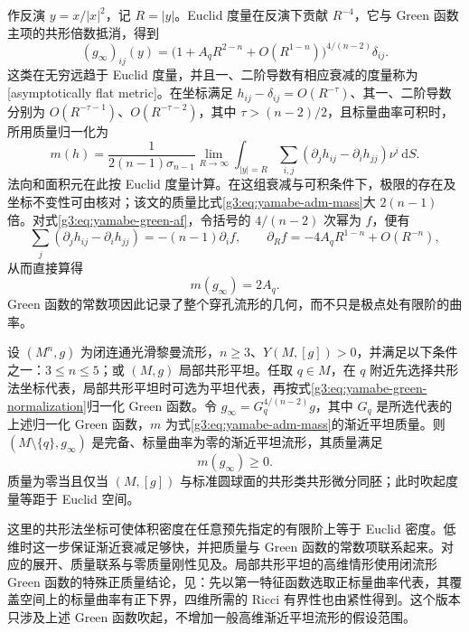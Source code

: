 \ProseParagraphBreak
作反演 \(y=x/|x|^2\)，记 \(R=|y|\)。Euclid 度量在反演下贡献 \(R^{-4}\)，它与 Green 函数主项的共形倍数抵消，得到
\begin{equation}\label{g3:eq:yamabe-green-af}
	(g_\infty)_{ij}(y)
	=\bigl(1+A_qR^{2-n}+O(R^{1-n})\bigr)^{4/(n-2)}\delta_{ij}.
\end{equation}
这类在无穷远趋于 Euclid 度量，并且一、二阶导数有相应衰减的度量称为[asymptotically flat metric]。在坐标满足
\(h_{ij}-\delta_{ij}=O(R^{-\tau})\)、其一、二阶导数分别为 \(O(R^{-\tau-1})\)、\(O(R^{-\tau-2})\)，其中 \(\tau>(n-2)/2\)，且标量曲率可积时，所用质量归一化为
\begin{equation}\label{g3:eq:yamabe-adm-mass}
	m(h)=\frac1{2(n-1)\sigma_{n-1}}
	\lim_{R\to\infty}\int_{|y|=R}
	\sum_{i,j}(\partial_jh_{ij}-\partial_ih_{jj})\nu^i\,\mathrm dS.
\end{equation}
法向和面积元在此按 Euclid 度量计算。在这组衰减与可积条件下，极限的存在及坐标不变性可由\cite[第9节，定理9.6]{LeeParker1987Yamabe}核对；该文的质量比式\eqref{g3:eq:yamabe-adm-mass}大 \(2(n-1)\) 倍。对式\eqref{g3:eq:yamabe-green-af}，令括号的 \(4/(n-2)\) 次幂为 \(f\)，便有
\[
	\sum_j(\partial_jh_{ij}-\partial_ih_{jj})
	=-(n-1)\partial_if,
	\qquad
	\partial_R f=-4A_qR^{1-n}+O(R^{-n}),
\]
从而直接算得
\begin{equation}\label{g3:eq:yamabe-mass-green-coefficient}
	m(g_\infty)=2A_q.
\end{equation}
Green 函数的常数项因此记录了整个穿孔流形的几何，而不只是极点处有限阶的曲率。

\begin{theorem}\label{g3:thm:yamabe-green-positive-mass}
	设 \((M^n,g)\) 为闭连通光滑黎曼流形，\(n\ge3\)、\(Y(M,[g])>0\)，并满足以下条件之一：\(3\le n\le5\)；或 \((M,g)\) 局部共形平坦。任取 \(q\in M\)，在 \(q\) 附近先选择共形法坐标代表，局部共形平坦时可选为平坦代表，再按式\eqref{g3:eq:yamabe-green-normalization}归一化 Green 函数。令 \(g_\infty=G_q^{4/(n-2)}g\)，其中 \(G_q\) 是所选代表的上述归一化 Green 函数，\(m\) 为式\eqref{g3:eq:yamabe-adm-mass}的渐近平坦质量。则 \((M\setminus\{q\},g_\infty)\) 是完备、标量曲率为零的渐近平坦流形，其质量满足
	\[
		m(g_\infty)\ge0.
	\]
	质量为零当且仅当 \((M,[g])\) 与标准圆球面的共形类共形微分同胚；此时吹起度量等距于 Euclid 空间。
\end{theorem}
这里的共形法坐标可使体积密度在任意预先指定的有限阶上等于 Euclid 密度。低维时这一步保证渐近衰减足够快，并把质量与 Green 函数的常数项联系起来。对应的展开、质量联系与零质量刚性见\cite[引理6.4、9.7，第10节]{LeeParker1987Yamabe}及\cite[第2节，引理3、命题2]{Schoen1984Yamabe}。局部共形平坦的高维情形使用闭流形 Green 函数的特殊正质量结论，见\cite[命题3.3(i)、4.4，第62、65页]{SchoenYau1988ConformallyFlat}：先以第一特征函数选取正标量曲率代表，其覆盖空间上的标量曲率有正下界，四维所需的 Ricci 有界性也由紧性得到。这个版本只涉及上述 Green 函数吹起，不增加一般高维渐近平坦流形的假设范围。

